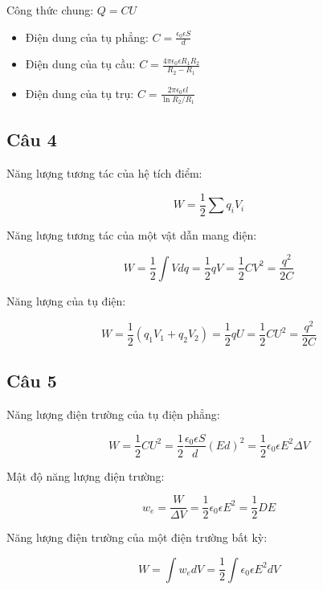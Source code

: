 Công thức chung: $Q = CU$

\begin{itemize}
  \item Điện dung của tụ phẳng: $C = \frac{\epsilon_0\epsilon S}{d}$
  \item Điện dung của tụ cầu: $C = \frac{4\pi\epsilon_0\epsilon R_1R_2}{R_2-R_1}$
  \item Điện dung của tụ trụ: $C = \frac{2\pi\epsilon_0\epsilon l}{\ln{R_2 / R_1}}$
\end{itemize}
 
\subsection{Câu 4}

Năng lượng tương tác của hệ tích điểm:

\begin{equation*}
  W = \frac{1}{2} \sum q_iV_i
\end{equation*}

Năng lượng tương tác của một vật dẫn mang điện:

\begin{equation*}
  W = \frac{1}{2} \int Vdq = \frac{1}{2} qV = \frac{1}{2} CV^2 = \frac{q^2}{2C}
\end{equation*}

Năng lượng của tụ điện:

\begin{equation*}
  W = \frac{1}{2} \left( q_1V_1 + q_2V_2 \right) = \frac{1}{2} qU = \frac{1}{2} CU^2 = \frac{q^2}{2C}
\end{equation*}

\subsection{Câu 5}

Năng lượng điện trường của tụ điện phẳng:

\begin{equation*}
  W = \frac{1}{2} CU^2 = \frac{1}{2} \frac{\epsilon_0\epsilon S}{d} (Ed)^2 = \frac{1}{2}\epsilon_0\epsilon E^2 \Delta V
\end{equation*}

Mật độ năng lượng điện trường:

\begin{equation*}
  w_e = \frac{W}{\Delta V} = \frac{1}{2} \epsilon_0\epsilon E^2 = \frac{1}{2}DE
\end{equation*}

Năng lượng điện trường của một điện trường bất kỳ:

\begin{equation*}
  W = \int w_e dV = \frac{1}{2} \int \epsilon_0\epsilon E^2dV
\end{equation*}

